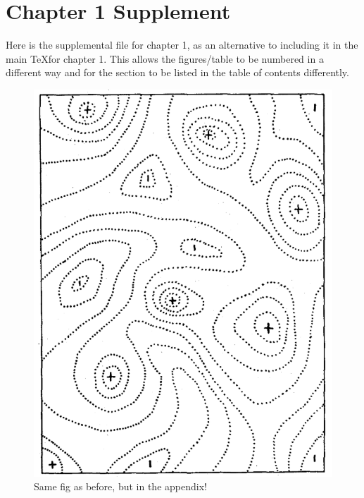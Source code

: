 \chapter{Chapter 1 Supplement} %

\label{Supp_chap1} %


Here is the supplemental file for chapter 1, as an alternative to including it in the main \TeX for chapter 1. This allows the figures/table to be numbered in a different way and for the section to be listed in the table of contents differently. 


\begin{figure}[h] %
	\centering
	\includegraphics[scale=0.4]{Figs/Wright_1932_1.pdf}
    \caption[Same Fig]{Same fig as before, but in the appendix!}
    \label{Another_fig}
\end{figure}
